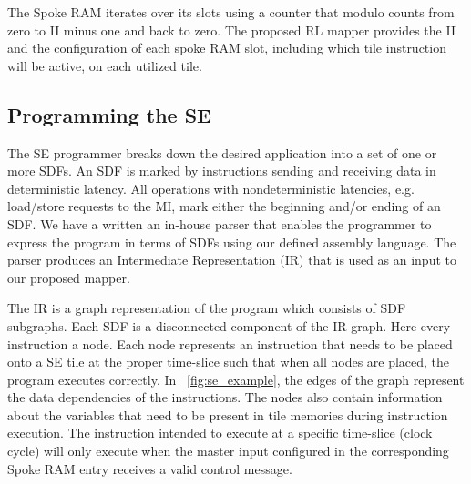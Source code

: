 The Spoke RAM iterates over its slots using a counter that modulo counts from zero to II minus one and back to zero.
The proposed RL mapper provides the II and the configuration of each spoke RAM slot, including which tile instruction will be active, on each utilized tile.

\subsection{Programming the SE}
The SE programmer breaks down the desired application into a set of one or more SDFs.
An SDF is marked by instructions sending and receiving data in deterministic latency.
All operations with nondeterministic latencies, e.g. load/store requests to the MI, mark either the beginning and/or ending of an SDF.
We have a written an in-house parser that enables the programmer to express the program in terms of SDFs using our defined assembly language.
The parser produces an Intermediate Representation (IR) that is used as an input to our proposed mapper.

The IR is a graph representation of the program which consists of SDF subgraphs. Each SDF is a disconnected component of the IR graph. Here every instruction a node.
Each node represents an instruction that needs to be placed onto a SE tile at the proper time-slice such that when all nodes are placed, the program executes correctly. 
In \figurename~\ref{fig:se_example}, the edges of the graph represent the data dependencies of the instructions. 
The nodes also contain information about the variables that need to be present in tile memories during instruction execution. 
The instruction intended to execute at a specific time-slice (clock cycle) will only execute when the master input configured in the corresponding Spoke RAM entry receives a valid control message.

